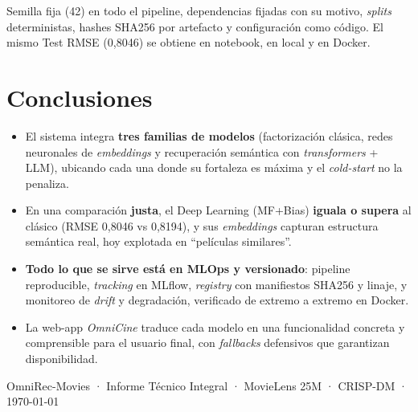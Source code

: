 \documentclass[11pt,a4paper]{article}
\begin{document}
\begin{infobox}
Semilla fija (42) en todo el pipeline, dependencias fijadas con su motivo, \textit{splits} deterministas, hashes SHA256 por artefacto y configuración como código. El mismo Test RMSE (0,8046) se obtiene en notebook, en local y en Docker.
\end{infobox}

\section{Conclusiones}
\label{sec:conclusiones}
\begin{itemize}
\item El sistema integra \textbf{tres familias de modelos} (factorización clásica, redes neuronales de \textit{embeddings} y recuperación semántica con \textit{transformers} + LLM), ubicando cada una donde su fortaleza es máxima y el \textit{cold-start} no la penaliza.
\item En una comparación \textbf{justa}, el Deep Learning (MF+Bias) \textbf{iguala o supera} al clásico (RMSE 0,8046 vs 0,8194), y sus \textit{embeddings} capturan estructura semántica real, hoy explotada en ``películas similares''.
\item \textbf{Todo lo que se sirve está en MLOps y versionado}: pipeline reproducible, \textit{tracking} en MLflow, \textit{registry} con manifiestos SHA256 y linaje, y monitoreo de \textit{drift} y degradación, verificado de extremo a extremo en Docker.
\item La web-app \textit{OmniCine} traduce cada modelo en una funcionalidad concreta y comprensible para el usuario final, con \textit{fallbacks} defensivos que garantizan disponibilidad.
\end{itemize}

\vfill
\begin{center}
\footnotesize\color{omnigray}
OmniRec-Movies · Informe Técnico Integral · MovieLens 25M · CRISP-DM · \today
\end{center}
\end{document}
